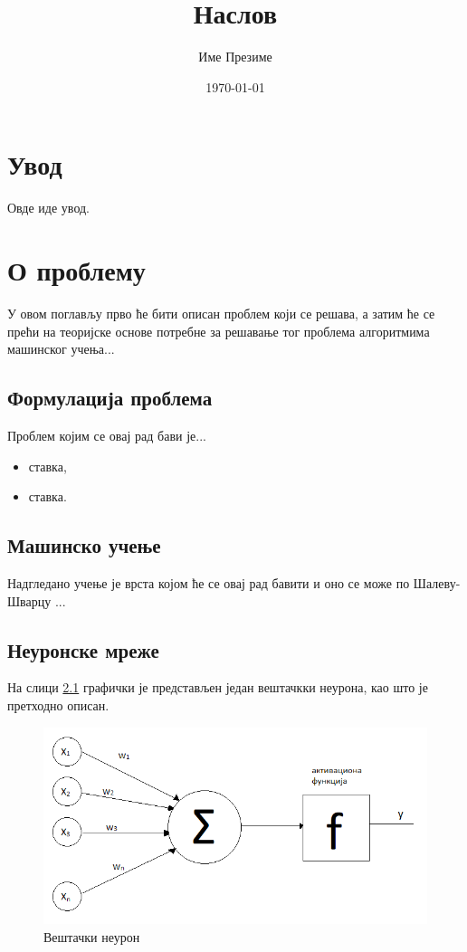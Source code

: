 \documentclass[a4paper, 12pt, master, utf8]{etf}
\author{Име Презиме}
\date{\today}
\title{Наслов}
\begin{document}
\maketitle

\tableofcontents

\onehalfspacing
\newpage

\chapter{Увод}
\label{sec:1}

Овде иде увод.

\chapter{О проблему}
\label{sec:2}
У овом поглављу прво ће бити описан проблем који се решава, а затим ће се прећи на теоријске основе потребне за решавање тог проблема алгоритмима машинског учења...

\section{Формулација проблема}
\label{sec:21}
Проблем којим се овај рад бави је...

\begin{itemize}[noitemsep]
    \item  ставка,
    \item  ставка.
\end{itemize}

\section{Машинско учење}
\label{sec:22}
Надгледано учење је врста којом ће се овај рад бавити и оно се може по Шалеву-Шварцу \cite{anthony2009neural}...

\section{Неуронске мреже}
\label{sec:23}
На слици \ref{fig:neuron} графички је представљен један вештачкки неурона, као што је претходно описан.

\begin{figure}[h]
    \centering
    \includegraphics[width=.8\textwidth]{img/neuron.png}
    \caption{Вештачки неурон}
    \label{fig:neuron}
\end{figure}
\end{document}
